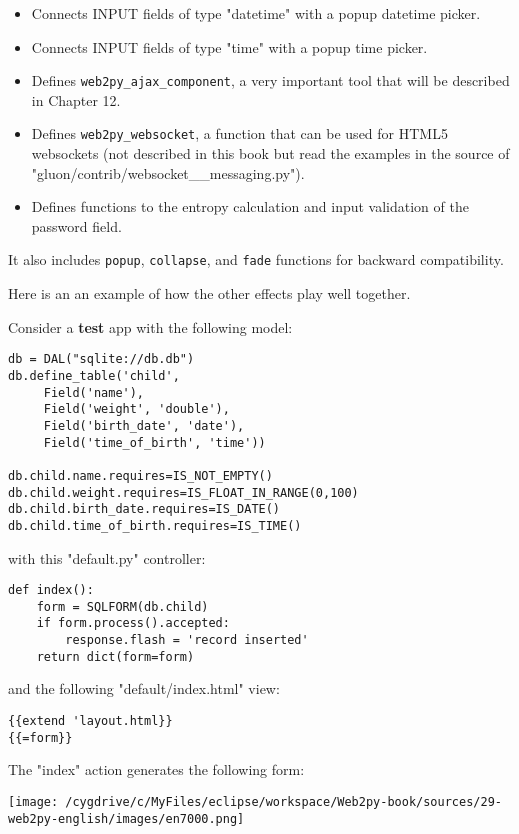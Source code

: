 \documentclass[justified,sixbynine,notoc]{tufte-book}
\def\ft{\small\tt}
\def\inxx#1{\index{#1}}
\begin{document}
\begin{fullwidth}
\begin{itemize}
\item Connects INPUT fields of type "datetime" with a popup datetime picker.

\item Connects INPUT fields of type "time" with a popup time picker.

\item Defines {\ft web2py\_ajax\_component}, a very important tool that will be described in Chapter 12.

\item Defines {\ft web2py\_websocket}, a function that can be used for HTML5 websockets (not described in this book but read the examples in the source of "gluon/contrib/websocket\_\_messaging.py"). \inxx{websockets}

\item Defines functions to the entropy calculation and input validation of the password field.
\end{itemize}

It also includes {\ft popup}, {\ft collapse}, and {\ft fade} functions for backward compatibility.

Here is an an example of how the other effects play well together.

Consider a {\bf test} app with the following model:
\begin{lstlisting}
db = DAL("sqlite://db.db")
db.define_table('child',
     Field('name'),
     Field('weight', 'double'),
     Field('birth_date', 'date'),
     Field('time_of_birth', 'time'))

db.child.name.requires=IS_NOT_EMPTY()
db.child.weight.requires=IS_FLOAT_IN_RANGE(0,100)
db.child.birth_date.requires=IS_DATE()
db.child.time_of_birth.requires=IS_TIME()
\end{lstlisting}
\noindent with this "default.py" controller:
\begin{lstlisting}
def index():
    form = SQLFORM(db.child)
    if form.process().accepted:
        response.flash = 'record inserted'
    return dict(form=form)
\end{lstlisting}
\noindent and the following "default/index.html" view:
\begin{lstlisting}[keywords={}]
{{extend 'layout.html}}
{{=form}}
\end{lstlisting}

The "index" action generates the following form:


\goodbreak\begin{center}\texttt{[image: /cygdrive/c/MyFiles/eclipse/workspace/Web2py-book/sources/29-web2py-english/images/en7000.png]}\end{center}



\end{fullwidth}
\end{document}
